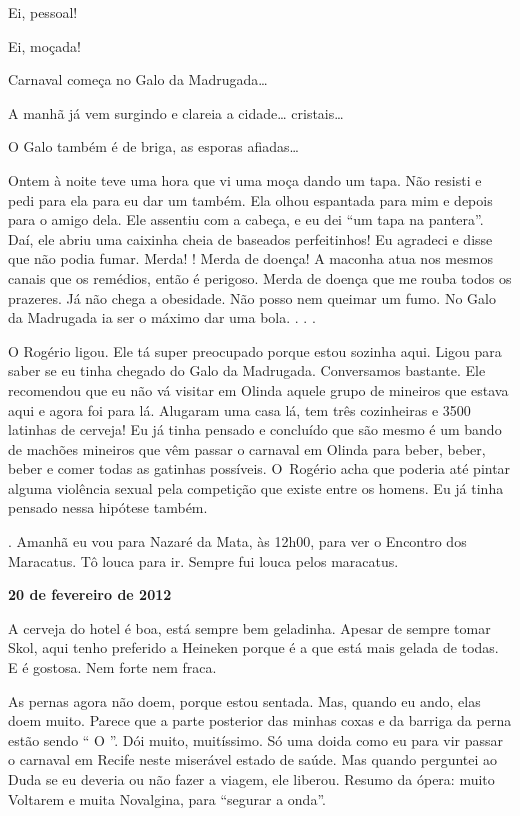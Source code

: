Ei, pessoal!

Ei, moçada!

Carnaval começa no Galo da Madrugada…

A manhã já vem surgindo e clareia a cidade…
cristais…

O Galo também é de briga, as esporas afiadas…

Ontem à noite teve uma hora que vi uma moça dando um tapa. Não resisti e
pedi para ela para eu dar um também. Ela olhou espantada para mim e
depois para o amigo dela. Ele assentiu com a cabeça, e eu dei ``um tapa
na pantera''. Daí, ele abriu uma caixinha cheia de baseados
perfeitinhos! Eu agradeci e disse que não podia fumar. Merda! !
Merda de doença! A maconha atua nos mesmos canais que os remédios, então
é perigoso. Merda de doença que me rouba todos os prazeres. Já não chega
a obesidade. Não posso nem queimar um fumo. No Galo da
Madrugada ia ser o máximo dar uma bola. . . .

O Rogério ligou. Ele tá super preocupado porque estou sozinha aqui.
Ligou para saber se eu tinha chegado do Galo da Madrugada. Conversamos
bastante. Ele recomendou que eu não vá visitar em Olinda aquele grupo de
mineiros que estava aqui e agora foi para lá. Alugaram uma casa lá, tem
três cozinheiras e 3500 latinhas de cerveja! Eu já tinha pensado e
concluído que são mesmo é um bando de machões mineiros que vêm passar o
carnaval em Olinda para beber, beber, beber e comer todas as gatinhas
possíveis. O~Rogério acha que poderia até pintar alguma violência sexual
pela competição que existe entre os homens. Eu já tinha pensado nessa
hipótese também.

 . Amanhã eu vou para Nazaré da Mata, às 12h00, para ver o
Encontro dos Maracatus. Tô louca para ir. Sempre fui louca pelos
maracatus.

\begin{center}\asterisc{}\end{center}


\begin{flushright}\textbf{20 de fevereiro de 2012}\end{flushright}


A cerveja do hotel é boa, está sempre bem geladinha. Apesar de sempre
tomar Skol, aqui tenho preferido a Heineken porque é a que está mais
gelada de todas. E é gostosa. Nem forte nem fraca.

As pernas agora não doem, porque estou sentada. Mas, quando eu ando,
elas doem muito. Parece que a parte posterior das minhas coxas e da
barriga da perna estão sendo `` O  ''. Dói muito,
muitíssimo. Só uma doida como eu para vir passar o carnaval em Recife
neste miserável estado de saúde. Mas quando perguntei ao Duda se eu
deveria ou não fazer a viagem, ele liberou. Resumo da ópera: muito
Voltarem e muita Novalgina, para ``segurar a onda''.

